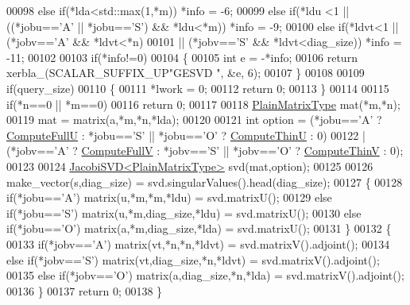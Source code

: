 \begin{DoxyCode}
00098   \textcolor{keywordflow}{else}  \textcolor{keywordflow}{if}(*lda<std::max(1,*m))                                   *info = -6;
00099   \textcolor{keywordflow}{else}  \textcolor{keywordflow}{if}(*ldu <1 || ((*jobu==\textcolor{charliteral}{'A'} || *jobu==\textcolor{charliteral}{'S'}) && *ldu<*m))    *info = -9;
00100   \textcolor{keywordflow}{else}  \textcolor{keywordflow}{if}(*ldvt<1 || (*jobv==\textcolor{charliteral}{'A'} && *ldvt<*n)
00101                    || (*jobv==\textcolor{charliteral}{'S'} && *ldvt<diag\_size))            *info = -11;
00102   
00103   \textcolor{keywordflow}{if}(*info!=0)
00104   \{
00105     \textcolor{keywordtype}{int} e = -*info;
00106     \textcolor{keywordflow}{return} xerbla\_(SCALAR\_SUFFIX\_UP\textcolor{stringliteral}{"GESVD "}, &e, 6);
00107   \}
00108   
00109   \textcolor{keywordflow}{if}(query\_size)
00110   \{
00111     *lwork = 0;
00112     \textcolor{keywordflow}{return} 0;
00113   \}
00114   
00115   \textcolor{keywordflow}{if}(*n==0 || *m==0)
00116     \textcolor{keywordflow}{return} 0;
00117   
00118   \hyperlink{group___core___module_class_eigen_1_1_matrix}{PlainMatrixType} mat(*m,*n);
00119   mat = matrix(a,*m,*n,*lda);
00120   
00121   \textcolor{keywordtype}{int} option = (*jobu==\textcolor{charliteral}{'A'} ? \hyperlink{group__enums_ggae3e239fb70022eb8747994cf5d68b4a9a2b4f91ca5859a4159dbfe8090043817f}{ComputeFullU} : *jobu==\textcolor{charliteral}{'S'} || *jobu==\textcolor{charliteral}{'O'} ? 
      \hyperlink{group__enums_ggae3e239fb70022eb8747994cf5d68b4a9af8c742a1aa87773e165eae406c9ccaf8}{ComputeThinU} : 0)
00122              | (*jobv==\textcolor{charliteral}{'A'} ? \hyperlink{group__enums_ggae3e239fb70022eb8747994cf5d68b4a9a52c6f7e80bbf9a42297c88f700245b51}{ComputeFullV} : *jobv==\textcolor{charliteral}{'S'} || *jobv==\textcolor{charliteral}{'O'} ? 
      \hyperlink{group__enums_ggae3e239fb70022eb8747994cf5d68b4a9a1055e53fa95c8ae04a07ebb72cfafd95}{ComputeThinV} : 0);
00123   
00124   \hyperlink{group___s_v_d___module_class_eigen_1_1_jacobi_s_v_d}{JacobiSVD<PlainMatrixType>} svd(mat,option);
00125   
00126   make\_vector(s,diag\_size) = svd.singularValues().head(diag\_size);
00127   \{
00128         \textcolor{keywordflow}{if}(*jobu==\textcolor{charliteral}{'A'}) matrix(u,*m,*m,*ldu)           = svd.matrixU();
00129   \textcolor{keywordflow}{else}  \textcolor{keywordflow}{if}(*jobu==\textcolor{charliteral}{'S'}) matrix(u,*m,diag\_size,*ldu)    = svd.matrixU();
00130   \textcolor{keywordflow}{else}  \textcolor{keywordflow}{if}(*jobu==\textcolor{charliteral}{'O'}) matrix(a,*m,diag\_size,*lda)    = svd.matrixU();
00131   \}
00132   \{
00133         \textcolor{keywordflow}{if}(*jobv==\textcolor{charliteral}{'A'}) matrix(vt,*n,*n,*ldvt)         = svd.matrixV().adjoint();
00134   \textcolor{keywordflow}{else}  \textcolor{keywordflow}{if}(*jobv==\textcolor{charliteral}{'S'}) matrix(vt,diag\_size,*n,*ldvt)  = svd.matrixV().adjoint();
00135   \textcolor{keywordflow}{else}  \textcolor{keywordflow}{if}(*jobv==\textcolor{charliteral}{'O'}) matrix(a,diag\_size,*n,*lda)    = svd.matrixV().adjoint();
00136   \}
00137   \textcolor{keywordflow}{return} 0;
00138 \}
\end{DoxyCode}
